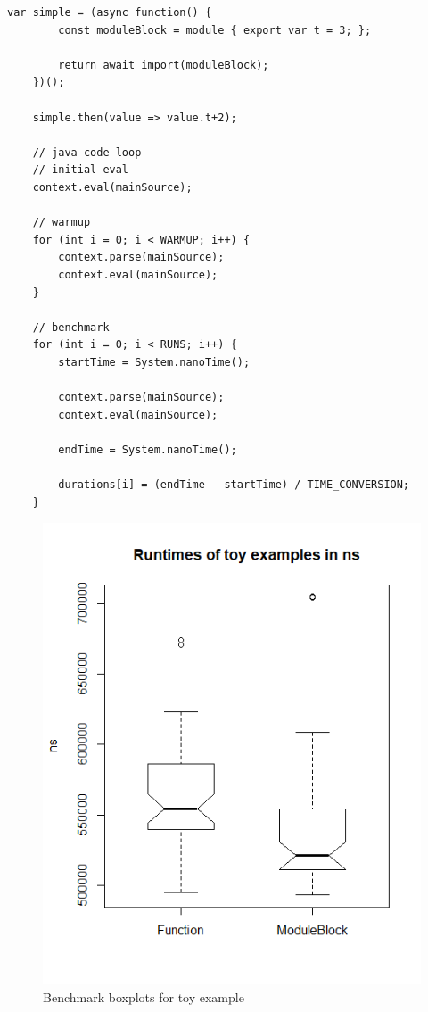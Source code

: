 \begin{lstlisting}[caption={Module block toy example}, label={fig:Toy}]
     var simple = (async function() {
        const moduleBlock = module { export var t = 3; };
        
        return await import(moduleBlock);
    })();
    
    simple.then(value => value.t+2);
    
    // java code loop
    // initial eval
    context.eval(mainSource);
    
    // warmup
    for (int i = 0; i < WARMUP; i++) {
        context.parse(mainSource);
        context.eval(mainSource);
    }
    
    // benchmark
    for (int i = 0; i < RUNS; i++) {
        startTime = System.nanoTime();
        
        context.parse(mainSource);
        context.eval(mainSource);
        
        endTime = System.nanoTime();
        
        durations[i] = (endTime - startTime) / TIME_CONVERSION;
    }
\end{lstlisting}

\begin{figure}[h!]
    \centering
    \includegraphics[scale=0.7]{figures/runtimesToyBoxplot.png}
    \caption{Benchmark boxplots for toy example}
    \label{fig:bToy}
\end{figure}


